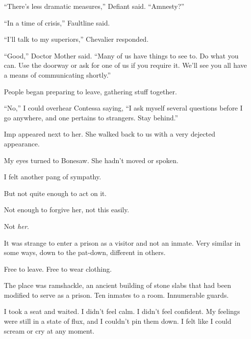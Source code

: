 ``There's less dramatic measures,'' Defiant said.  ``Amnesty?''



``In a time of crisis,'' Faultline said.



``I'll talk to my superiors,'' Chevalier responded.



``Good,'' Doctor Mother said.  ``Many of us have things to see to.  Do what you can.  Use the doorway or ask for one of us if you require it.  We'll see you all have a means of communicating shortly.''



People began preparing to leave, gathering stuff together.



``No,'' I could overhear Contessa saying, ``I ask myself several questions before I go anywhere, and one pertains to strangers.  Stay behind.''



Imp appeared next to her.  She walked back to us with a very dejected appearance.



My eyes turned to Bonesaw.  She hadn't moved or spoken.



I felt another pang of sympathy.



But not quite enough to act on it.



Not enough to forgive her, not this easily.



Not \emph{her}.



\blacksquare



It was strange to enter a prison as a visitor and not an inmate.  Very similar in some ways, down to the pat-down, different in others.



Free to leave.  Free to wear clothing.



The place was ramshackle, an ancient building of stone slabs that had been modified to serve as a prison.  Ten inmates to a room.  Innumerable guards.



I took a seat and waited.  I didn't feel calm.  I didn't feel confident.  My feelings were still in a state of flux, and I couldn't pin them down.  I felt like I could scream or cry at any moment.



